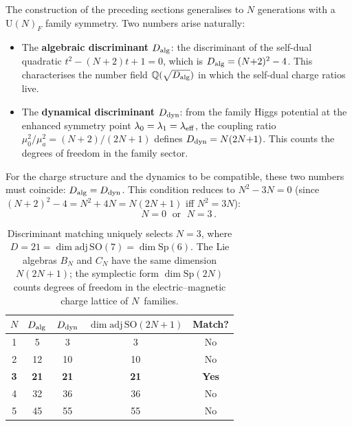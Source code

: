 \documentclass[12pt,a4paper]{article}
\newcommand{\UU}{\mathrm{U}}
\newcommand{\SO}{\mathrm{SO}}
\newcommand{\adj}{\mathrm{adj}}
\newcommand{\Sp}{\mathrm{Sp}}
\begin{document}
The construction of the preceding sections generalises to $N$
generations with a $\UU(N)_F$ family symmetry. Two numbers arise
naturally:
\begin{itemize}
  \item The \textbf{algebraic discriminant} $D_{\rm alg}$: the
    discriminant of the self-dual quadratic $t^2 - (N{+}2)t + 1 = 0$,
    which is $D_{\rm alg} = (N{+}2)^2 - 4$. This characterises the
    number field $\mathbb{Q}(\sqrt{D_{\rm alg}})$ in which the
    self-dual charge ratios live.
  \item The \textbf{dynamical discriminant} $D_{\rm dyn}$: from the
    family Higgs potential at the
    enhanced symmetry point $\lambda_0 = \lambda_1 = \lambda_{\rm eff}$,
    the coupling ratio $\mu_0^2/\mu_a^2 = (N{+}2)/(2N{+}1)$ defines
    $D_{\rm dyn} = N(2N{+}1)$. This counts the degrees of freedom in
    the family sector.
\end{itemize}
For the charge structure and the dynamics to be compatible, these
two numbers must coincide: $D_{\rm alg} = D_{\rm dyn}$.
This condition reduces to $N^2 - 3N = 0$
(since $(N{+}2)^2 - 4 = N^2 + 4N = N(2N{+}1)$ iff $N^2 = 3N$):
\begin{equation}
  \boxed{N = 0 \;\text{ or }\; N = 3\,.}
  \label{eq:N3}
\end{equation}

\begin{table}[ht]
\centering
\begin{tabular}{ccccc}
\toprule
$N$ & $D_{\rm alg}$ & $D_{\rm dyn}$ & $\dim\adj\,\SO(2N{+}1)$ & Match? \\
\midrule
1 & 5  & 3  & 3  & No \\
2 & 12 & 10 & 10 & No \\
\textbf{3} & \textbf{21} & \textbf{21} & \textbf{21} & \textbf{Yes} \\
4 & 32 & 36 & 36 & No \\
5 & 45 & 55 & 55 & No \\
\bottomrule
\end{tabular}
\caption{Discriminant matching uniquely selects $N=3$, where
$D = 21 = \dim\adj\,\SO(7) = \dim\Sp(6)$. The Lie algebras $B_N$ and $C_N$
have the same dimension $N(2N{+}1)$; the symplectic form
$\dim\Sp(2N)$ counts degrees of freedom in the electric--magnetic
charge lattice of $N$~families.}
\label{tab:N3}
\end{table}
\end{document}
